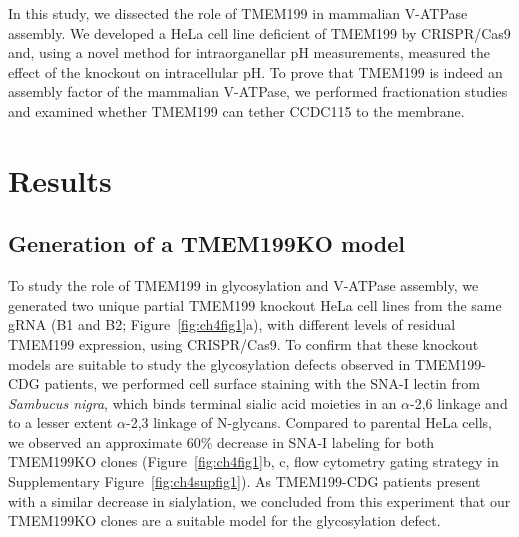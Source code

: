 In this study, we dissected the role of TMEM199 in mammalian V-ATPase assembly. We developed a HeLa cell line deficient of TMEM199 by CRISPR/Cas9 and, using a novel method for intraorganellar pH measurements, measured the effect of the knockout on intracellular pH. To prove that TMEM199 is indeed an assembly factor of the mammalian V-ATPase, we performed fractionation studies and examined whether TMEM199 can tether CCDC115 to the membrane.

\section{Results}

\subsection{Generation of a TMEM199KO model}

To study the role of TMEM199 in glycosylation and V-ATPase assembly, we generated two unique partial TMEM199 knockout HeLa cell lines from the same gRNA (B1 and B2; Figure~\ref{fig:ch4fig1}a), with different levels of residual TMEM199 expression, using CRISPR/Cas9. 
To confirm that these knockout models are suitable to study the glycosylation defects observed in TMEM199-CDG patients\cite{jansen_tmem199_2016}, we performed cell surface staining with the SNA-I lectin from \emph{Sambucus nigra}, which binds terminal sialic acid moieties in an $\alpha$-2,6 linkage and to a lesser extent $\alpha$-2,3 linkage of N-glycans. Compared to parental HeLa cells, we observed an approximate 60\% decrease in SNA-I labeling for both TMEM199KO clones (Figure~\ref{fig:ch4fig1}b, c, flow cytometry gating strategy in Supplementary Figure~\ref{fig:ch4supfig1}). As TMEM199-CDG patients present with a similar decrease in sialylation\cite{jansen_tmem199_2016}, we concluded from this experiment that our TMEM199KO clones are a suitable model for the glycosylation defect.

